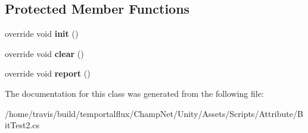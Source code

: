 \subsection*{Protected Member Functions}
\begin{DoxyCompactItemize}
\item 
\hypertarget{class_bit_test2_a771a1f26d53e4c517c699a8f3b7d0030}{override void {\bfseries init} ()}\label{class_bit_test2_a771a1f26d53e4c517c699a8f3b7d0030}

\item 
\hypertarget{class_bit_test2_a8cb95cc5e19810422c02ae5cb6cbebb7}{override void {\bfseries clear} ()}\label{class_bit_test2_a8cb95cc5e19810422c02ae5cb6cbebb7}

\item 
\hypertarget{class_bit_test2_a6b18710da1118238f4d184b14094ab17}{override void {\bfseries report} ()}\label{class_bit_test2_a6b18710da1118238f4d184b14094ab17}

\end{DoxyCompactItemize}


The documentation for this class was generated from the following file\-:\begin{DoxyCompactItemize}
\item 
/home/travis/build/temportalflux/\-Champ\-Net/\-Unity/\-Assets/\-Scripts/\-Attribute/Bit\-Test2.\-cs\end{DoxyCompactItemize}
